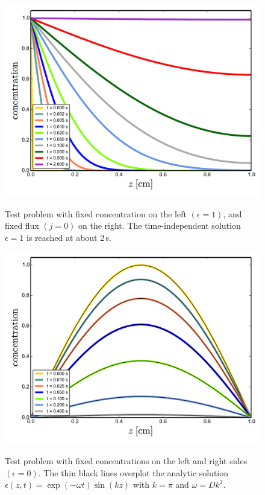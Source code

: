 \documentclass[11pt]{article}
\begin{document}
\begin{figure}
\centering
\vspace*{-5mm}
\includegraphics[width=14cm]{test2.pdf}\\[-5mm]
\caption{Test problem with fixed concentration on the left
  $(\epsilon=1)$, and fixed flux $(j=0)$ on the right.  The
  time-independent solution $\epsilon=1$ is reached at about 2\,s.}
\label{fig2}
\end{figure}

\begin{figure}
\centering
\vspace*{-5mm}
\includegraphics[width=14cm]{test3.pdf}\\[-5mm]
\caption{Test problem with fixed concentrations on the left and right
  sides $(\epsilon=0)$. The thin black lines overplot the analytic
  solution $\epsilon(z,t)=\exp(-\omega t) \sin(k z)$ with $k=\pi$ and
  $\omega=D k^2$.}
\label{fig3}
\end{figure}
\end{document}
